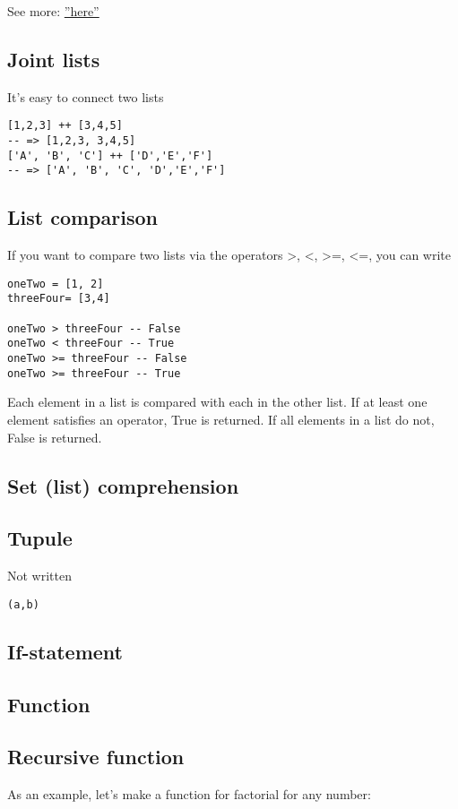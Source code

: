 See more: \href{https://wiki.haskell.org/Learn_Haskell_in_10_minutes#Simple_types}{''here''}

\subsection{Joint lists}
It’s easy to connect two lists
\begin{lstlisting}
[1,2,3] ++ [3,4,5]
-- => [1,2,3, 3,4,5]
['A', 'B', 'C'] ++ ['D','E','F']
-- => ['A', 'B', 'C', 'D','E','F']
\end{lstlisting}

\subsection{List comparison}
If you want to compare two lists via the operators >, <, >=, <=, you can write 
\begin{lstlisting}
oneTwo = [1, 2]
threeFour= [3,4]

oneTwo > threeFour -- False
oneTwo < threeFour -- True
oneTwo >= threeFour -- False
oneTwo >= threeFour -- True
\end{lstlisting}

Each element in a list is compared with each in the other list. If at least one element satisfies an operator, True is returned. If all elements in a list do not, False is returned. 

\subsection{Set (list) comprehension}

\subsection{Tupule}
Not written 
\begin{lstlisting}
(a,b)
\end{lstlisting}

\subsection{If-statement}

\subsection{Function}

\subsection{Recursive function}
As an example, let’s make a function for factorial for any number:

